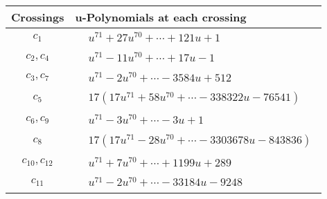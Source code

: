 \documentclass[1p]{elsarticle_modified}
\theoremstyle{definition}
\begin{document}
\begin{tabular}{m{50pt}|m{274pt}}
Crossings & \hspace{64pt}u-Polynomials at each crossing \\
\hline $$\begin{aligned}c_{1}\end{aligned}$$&$\begin{aligned}
&u^{71}+27 u^{70}+\cdots+121 u+1
\end{aligned}$\\
\hline $$\begin{aligned}c_{2},c_{4}\end{aligned}$$&$\begin{aligned}
&u^{71}-11 u^{70}+\cdots+17 u-1
\end{aligned}$\\
\hline $$\begin{aligned}c_{3},c_{7}\end{aligned}$$&$\begin{aligned}
&u^{71}-2 u^{70}+\cdots-3584 u+512
\end{aligned}$\\
\hline $$\begin{aligned}c_{5}\end{aligned}$$&$\begin{aligned}
&17(17 u^{71}+58 u^{70}+\cdots-338322 u-76541)
\end{aligned}$\\
\hline $$\begin{aligned}c_{6},c_{9}\end{aligned}$$&$\begin{aligned}
&u^{71}-3 u^{70}+\cdots-3 u+1
\end{aligned}$\\
\hline $$\begin{aligned}c_{8}\end{aligned}$$&$\begin{aligned}
&17(17 u^{71}-28 u^{70}+\cdots-3303678 u-843836)
\end{aligned}$\\
\hline $$\begin{aligned}c_{10},c_{12}\end{aligned}$$&$\begin{aligned}
&u^{71}+7 u^{70}+\cdots+1199 u+289
\end{aligned}$\\
\hline $$\begin{aligned}c_{11}\end{aligned}$$&$\begin{aligned}
&u^{71}-2 u^{70}+\cdots-33184 u-9248
\end{aligned}$\\
\hline
\end{tabular}\\~\\
\end{document}
